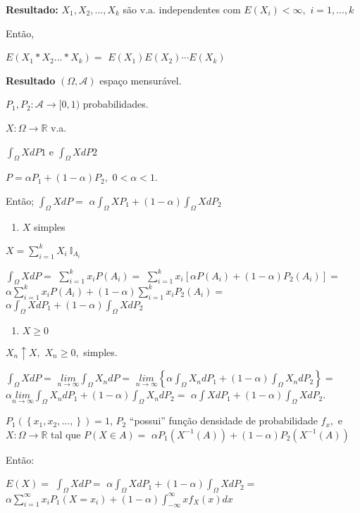 \documentclass[
]{book}
\providecommand{\tightlist}{%
  \setlength{\itemsep}{0pt}\setlength{\parskip}{0pt}}
\begin{document}
\textbf{Resultado:} \(X_1,X_2,...,X_k\) são v.a. independentes com \(E(X_i)<\infty,\) \(i=1,...,k\)

Então,

\(E(X_1*X_2\dots*X_k) =\) \(E(X_1)E(X_2)\cdots E(X_k)\)

\textbf{Resultado} \((\Omega,\mathcal{A})\) espaço mensurável.

\(P_1,P_2: \mathcal{A}\longrightarrow [0,1)\) probabilidades.

\(X: \Omega \longrightarrow \mathbb{R}\) v.a.

\(\int_\Omega X dP1\) e \(\int_\Omega X dP2\)

\(P=\alpha P_1 +(1-\alpha)P_2,\) \(0<\alpha<1.\)

Então; \(\int_\Omega XdP =\) \(\alpha \int_\Omega XP_1 + (1-\alpha)\int_\Omega XdP_2\)

\begin{enumerate}
\def\labelenumi{\arabic{enumi}.}
\tightlist
\item
  \(X\) simples
\end{enumerate}

\(X=\sum_{i=1}^kX_i~\mathbb{I}_{A_i}\)

\(\int_\Omega XdP=\) \(\sum_{i=1}^kx_iP(A_i)=\) \(\sum_{i=1}^k x_i[\alpha P(A_i)+(1-\alpha)P_2(A_i)]=\) \(\alpha \sum_{i=1}^k x_iP(A_i)+(1-\alpha)\sum_{i=1}^k x_iP_2(A_i)=\) \(\alpha \int_\Omega XdP_1+(1-\alpha)\int_\Omega XdP_2\)

\begin{enumerate}
\def\labelenumi{\arabic{enumi}.}
\setcounter{enumi}{1}
\tightlist
\item
  \(X \geq 0\)
\end{enumerate}

\(X_n \uparrow X,\) \(X_n \geq 0,\) simples.

\(\int_\Omega XdP=\) \(\underset{n\rightarrow\infty}{lim}\int_\Omega X_n dP=\) \(\underset{n\rightarrow\infty}{lim}\left\{\alpha\int_\Omega X_ndP_1+(1-\alpha)\int_\Omega X_ndP_2\right\}=\) \(\alpha \underset{n\rightarrow\infty}{lim}\int_\Omega X_ndP_1 + (1-\alpha)\int_\Omega X_n dP_2=\) \(\alpha \int XdP_1 + (1-\alpha)\int_\Omega XdP_2.\)

\(P_1(\left\{x_1,x_2,...,\right\})=1\), \(P_2\) ``possui'' função densidade de probabilidade \(f_x,\) e \(X:\Omega \longrightarrow \mathbb{R}\) tal que \(P(X \in A)=\) \(\alpha P_1(X^{-1}(A))+(1-\alpha)P_2(X^{-1}(A))\)

Então:

\(E(X)=\) \(\int_\Omega XdP=\) \(\alpha \int_\Omega XdP_1 + (1-\alpha)\int_\Omega XdP_2=\) \(\alpha \sum_{i=1}^\infty x_iP_1(X=x_i)+(1-\alpha)\int_{-\infty}^\infty x f_X(x)dx\)
\end{document}
